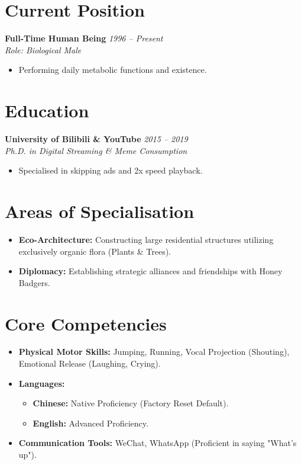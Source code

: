 \documentclass[11pt, a4paper]{article}
\begin{document}
\section{Current Position}
\textbf{Full-Time Human Being} \hfill \textit{1996 -- Present} \\
\textit{Role: Biological Male}
\begin{itemize}[noitemsep]
    \item Performing daily metabolic functions and existence.
\end{itemize}

\section{Education}
\textbf{University of Bilibili \& YouTube} \hfill \textit{2015 -- 2019} \\
\textit{Ph.D. in Digital Streaming \& Meme Consumption}
\begin{itemize}[noitemsep]
    \item Specialised in skipping ads and 2x speed playback.
\end{itemize}

\section{Areas of Specialisation}
\begin{itemize}[leftmargin=*, label=\textcolor{MYHONEYGOLD}{\faLeaf}]
    \item \textbf{Eco-Architecture:} Constructing large residential structures utilizing exclusively organic flora (Plants \& Trees).
    \item \textbf{Diplomacy:} Establishing strategic alliances and friendships with Honey Badgers.
\end{itemize}

\section{Core Competencies}
\begin{itemize}[leftmargin=*]
    \item \textbf{Physical Motor Skills:} Jumping, Running, Vocal Projection (Shouting), Emotional Release (Laughing, Crying).
    \item \textbf{Languages:} 
        \begin{itemize}
            \item \textbf{Chinese:} Native Proficiency (Factory Reset Default).
            \item \textbf{English:} Advanced Proficiency.
        \end{itemize}
    \item \textbf{Communication Tools:} WeChat, WhatsApp (Proficient in saying "What's up").
\end{itemize}
\end{document}
